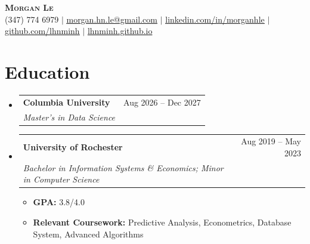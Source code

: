\documentclass[a4paper,11pt]{article}
\makeatletter
\newcommand{\resumeItem}[1]{
  \item\small{
    {#1 \vspace{-2pt}}
  }
}
\newcommand{\resumeSubheading}[4]{
  \vspace{-2pt}\item
    \begin{tabular*}{0.97\textwidth}[t]{l@{\extracolsep{\fill}}r}
      \textbf{#1} & #2 \\
      \textit{\small#3} & \textit{\small #4} \\
    \end{tabular*}\vspace{-7pt}
}
\newcommand{\resumeSubHeadingListStart}{\begin{itemize}[leftmargin=0.15in, label={}]}
\newcommand{\resumeSubHeadingListEnd}{\end{itemize}}
\newcommand{\resumeItemListStart}{\begin{itemize}}
\newcommand{\resumeItemListEnd}{\end{itemize}\vspace{-5pt}}
\makeatother
\begin{document}
\begin{center}
  \textbf{\Huge \scshape Morgan Le} \\ \vspace{1pt}
  \small (347) 774 6979 $|$
  \href{mailto:morgan.hn.le@gmail.com}{\underline{morgan.hn.le@gmail.com}} $|$
  \href{https://www.linkedin.com/in/morganhle/}{\underline{linkedin.com/in/morganhle}} $|$
  \href{https://github.com/lhnminh}{\underline{github.com/lhnminh}} $|$
  \href{https://lhnminh.github.io/}{lhnminh.github.io}
\end{center}

\section{Education}
\resumeSubHeadingListStart
  \resumeSubheading
    {Columbia University}{Aug 2026 -- Dec 2027}
    {Master's in Data Science}{}
  \resumeSubheading
    {University of Rochester}{Aug 2019 -- May 2023}
    {Bachelor in Information Systems \& Economics; Minor in Computer Science}{}
    \resumeItemListStart
      \resumeItem{{\bfseries GPA:} 3.8/4.0}
      \resumeItem{{\bfseries Relevant Coursework:} Predictive Analysis, Econometrics, Database System, Advanced Algorithms}
    \resumeItemListEnd
\resumeSubHeadingListEnd
\end{document}
